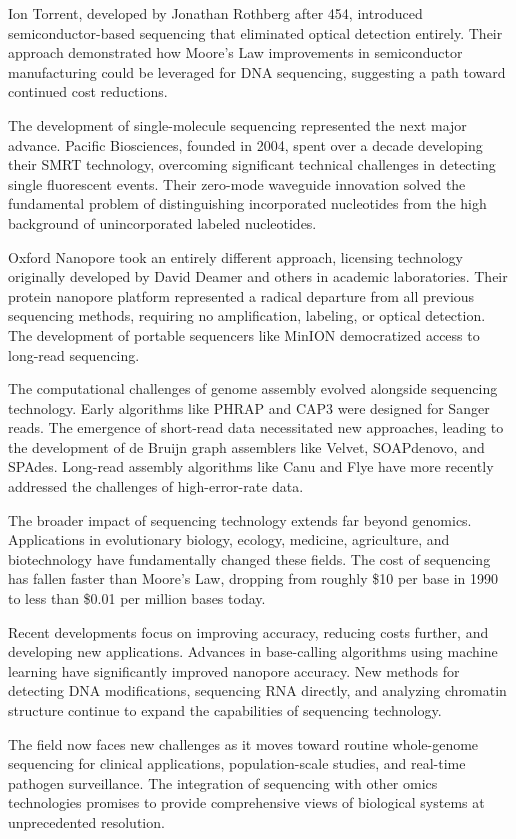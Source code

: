 \begin{historical}
Ion Torrent, developed by Jonathan Rothberg after 454, introduced semiconductor-based sequencing that eliminated optical detection entirely. Their approach demonstrated how Moore's Law improvements in semiconductor manufacturing could be leveraged for DNA sequencing, suggesting a path toward continued cost reductions.

The development of single-molecule sequencing represented the next major advance. Pacific Biosciences, founded in 2004, spent over a decade developing their SMRT technology, overcoming significant technical challenges in detecting single fluorescent events. Their zero-mode waveguide innovation solved the fundamental problem of distinguishing incorporated nucleotides from the high background of unincorporated labeled nucleotides.

Oxford Nanopore took an entirely different approach, licensing technology originally developed by David Deamer and others in academic laboratories. Their protein nanopore platform represented a radical departure from all previous sequencing methods, requiring no amplification, labeling, or optical detection. The development of portable sequencers like MinION democratized access to long-read sequencing.

The computational challenges of genome assembly evolved alongside sequencing technology. Early algorithms like PHRAP and CAP3 were designed for Sanger reads. The emergence of short-read data necessitated new approaches, leading to the development of de Bruijn graph assemblers like Velvet, SOAPdenovo, and SPAdes. Long-read assembly algorithms like Canu and Flye have more recently addressed the challenges of high-error-rate data.

The broader impact of sequencing technology extends far beyond genomics. Applications in evolutionary biology, ecology, medicine, agriculture, and biotechnology have fundamentally changed these fields. The cost of sequencing has fallen faster than Moore's Law, dropping from roughly \$10 per base in 1990 to less than \$0.01 per million bases today.

Recent developments focus on improving accuracy, reducing costs further, and developing new applications. Advances in base-calling algorithms using machine learning have significantly improved nanopore accuracy. New methods for detecting DNA modifications, sequencing RNA directly, and analyzing chromatin structure continue to expand the capabilities of sequencing technology.

The field now faces new challenges as it moves toward routine whole-genome sequencing for clinical applications, population-scale studies, and real-time pathogen surveillance. The integration of sequencing with other omics technologies promises to provide comprehensive views of biological systems at unprecedented resolution.
\end{historical}
